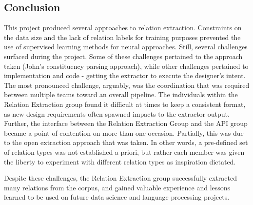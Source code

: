 \documentclass[11pt,letterpaper]{article}
\begin{document}
\subsection{Conclusion}

This project produced several approaches to relation extraction.  Constraints on the data size and the lack of relation labels for training purposes prevented the use of supervised learning methods for neural approaches.  Still, several challenges surfaced during the project.  Some of these challenges pertained to the approach taken (John's constituency parsing approach), while other challenges pertained to implementation and code - getting the extractor to execute the designer's intent.  The most pronounced challenge, arguably, was the coordination that was required between multiple teams toward an overall pipeline.  The individuals within the Relation Extraction group found it difficult at times to keep a consistent format, as new design requirements often spawned impacts to the extractor output.  Further, the interface between the Relation Extraction Group and the API group became a point of contention on more than one occasion.  Partially, this was due to the open extraction approach that was taken.  In other words, a pre-defined set of relation types was not established a priori, but rather each member was given the liberty to experiment with different relation types as inspiration dictated.

Despite these challenges, the Relation Extraction group successfully extracted many relations from the corpus, and gained valuable experience and lessons learned to be used on future data science and language processing projects.



\end{document}

